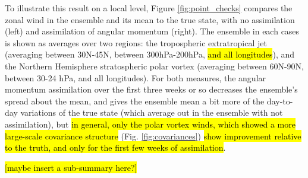 To illustrate this result on a local level, Figure \ref{fig:point_checks} compares the zonal wind in the ensemble and its mean to the true state, with no assimilation (left) and assimilation of angular momentum (right). 
The ensemble in each cases is shown as averages over two regions: the tropospheric extratropical jet (averaging between 30N-45N, between 300hPa-200hPa, \hl{and all longitudes}), and the Northern Hemisphere stratospheric polar vortex (averaging between 60N-90N, between 30-24 hPa, and all longitudes).
For both measures, the angular momentum assimilation over the first three weeks or so decreases the ensemble's spread about the mean, and gives the ensemble mean a bit more of the day-to-day variations of the true state (which average out in the ensemble with not assimilation), but \hl{in general, only the polar vortex winds, which showed a more large-scale covariance structure} (Fig. \ref{fig:covariances}) \hl{show improvement relative to the truth, and only for the first few weeks of assimilation}. 

\hl{[maybe insert a sub-summary here?]}
